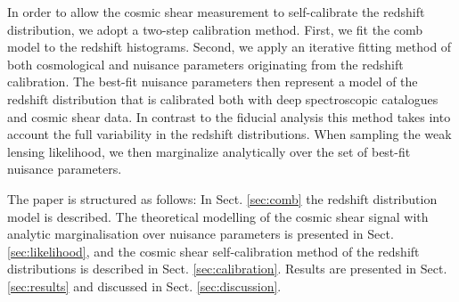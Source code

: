 \documentclass{aa}
\begin{document}
In order to allow the cosmic shear measurement to self-calibrate the redshift distribution, we adopt a two-step calibration method. First, we fit the comb model to the redshift histograms. Second, we apply an iterative fitting method of both cosmological and nuisance parameters originating from the redshift calibration. The best-fit nuisance parameters then represent a model of the redshift distribution that is calibrated both with deep spectroscopic catalogues and cosmic shear data. In contrast to the fiducial analysis this method takes into account the full variability in the redshift distributions. When sampling the weak lensing likelihood, we then marginalize analytically over the set of best-fit nuisance parameters.
 
The paper is structured as follows: In Sect. \ref{sec:comb} the redshift distribution model is described. The theoretical modelling of the cosmic shear signal with analytic marginalisation over nuisance parameters is presented in Sect. \ref{sec:likelihood}, and the cosmic shear self-calibration method of the redshift distributions is described in Sect. \ref{sec:calibration}. Results are presented in Sect. \ref{sec:results} and discussed in Sect. \ref{sec:discussion}.
 
\end{document}
